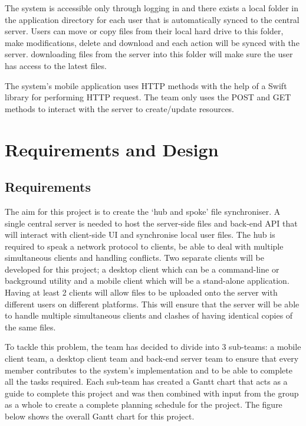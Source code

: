 \documentclass{article}
\begin{document}
The system is accessible only through logging in and there exists a local folder in the application directory for each user that is automatically synced to the central server. Users can move or copy files from their local hard drive to this folder, make modifications, delete and download and each action will be synced with the server. downloading files from the server into this folder will make sure the user has access to the latest files.

The system's mobile application uses HTTP methods with the help of a Swift library \cite{c11} for performing HTTP request. The team only uses the POST and GET methods to interact with the server to create/update resources.

\section{Requirements and Design}
\subsection{Requirements}
The aim for this project is to create the ‘hub and spoke’ file synchroniser. A single central server is needed to host the server-side files and back-end API that will interact with client-side UI and synchronise local user files. The hub is required to speak a network protocol to clients, be able to deal with multiple simultaneous clients and handling conflicts. Two separate clients will be developed for this project; a desktop client which can be a command-line or background utility and a mobile client which will be a stand-alone application. Having at least 2 clients will allow files to be uploaded onto the server with different users on different platforms. This will ensure that the server will be able to handle multiple simultaneous clients and clashes of having identical copies of the same files.\newline

To tackle this problem, the team has decided to divide into 3 sub-teams: a mobile client team, a desktop client team and back-end server team to ensure that every member contributes to the system’s implementation and to be able to complete all the tasks required. Each sub-team has created a Gantt chart that acts as a guide to complete this project and was then combined with input from the group as a whole to create a complete planning schedule for the project. The figure below shows the overall Gantt chart for this project.
\end{document}
